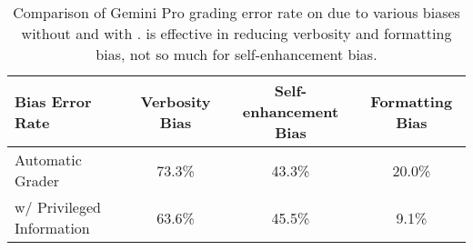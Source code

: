 
\begin{table}[!ht]
\centering
\begin{tabular}{l ccc}
\toprule
\textbf{Bias Error Rate}             & \textbf{Verbosity Bias}    & \textbf{Self-enhancement Bias} & \textbf{Formatting Bias} \\ 
\midrule
Automatic Grader            & 73.3\%    & 43.3\%    & 20.0\% \\
w/ Privileged Information   & 63.6\%    & 45.5\%    & 9.1\% \\
\bottomrule
\end{tabular}

\begin{minipage}[t]{0.9\textwidth}
    \vspace{0.75em}
    \caption{
        \small
        Comparison of Gemini Pro grading error rate on \VibeEval due to various biases without and with \PI. \PI is effective in reducing verbosity and formatting bias, not so much for self-enhancement bias.
    }
    \label{tab:debias}
\end{minipage}
\end{table}